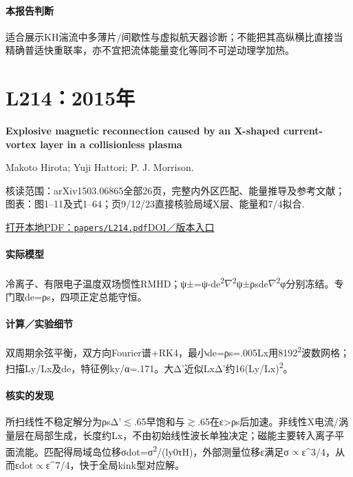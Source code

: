 \paragraph{本报告判断}适合展示KH湍流中多薄片/间歇性与虚拟航天器诊断；不能把其高纵横比直接当精确普适快重联率，亦不宜把流体能量变化等同不可逆动理学加热。

\section{L214：2015年}\label{paper:L214}

\textbf{Explosive magnetic reconnection caused by an X-shaped current-vortex layer in a collisionless plasma}\citep{L214}\

Makoto Hirota;  Yuji Hattori;  P. J. Morrison.

\textsf{核读范围：}arXiv1503.06865全部26页，完整内外区匹配、能量推导及参考文献；\textsf{图表：}图1–11及式1–64；页9/12/23直接核验局域X层、能量和7/4拟合.

\href{run:papers/L214.pdf}{打开本地PDF：\texttt{papers/L214.pdf}}\quad\href{https://doi.org/10.1063/1.4921329}{DOI／版本入口}

\paragraph{实际模型}冷离子、有限电子温度双场惯性RMHD；ψ±=ψ-de\textsuperscript{2}\ensuremath{\nabla}\textsuperscript{2}ψ±ρsde\ensuremath{\nabla}\textsuperscript{2}φ分别冻结。专门取de=ρs，四项正定总能守恒。

\paragraph{计算／实验细节}双周期余弦平衡，双方向Fourier谱+RK4，最小de=ρs=.005Lx用8192\textsuperscript{2}波数网格；扫描Ly/Lx及de，特征例ky/α=.171。大Δ'近似LxΔ'约16(Ly/Lx)\textsuperscript{2}。

\paragraph{核实的发现}所扫线性不稳定解分为ρsΔ'\ensuremath{\lesssim}.65早饱和与\ensuremath{\gtrsim}.65在ε>ρs后加速。非线性X电流/涡量层在局部生成，长度约Lx，不由初始线性波长单独决定；磁能主要转入离子平面流能。匹配得局域岛位移σdot=σ\textsuperscript{2}/(ly0τH)，外部测量位移ε满足σ\ensuremath{\propto}ε\textasciicircum{}3/4，从而εdot\ensuremath{\propto}ε\textasciicircum{}7/4，快于全局kink型对应解。

